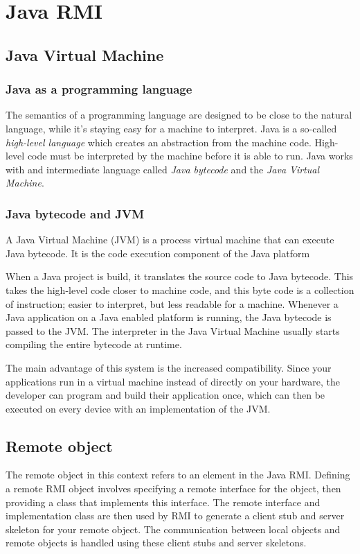 \section{Java RMI}
\subsection{Java Virtual Machine}
\subsubsection{Java as a programming language}
The semantics of a programming language are designed to be close to the natural language, while it's staying easy for a machine to interpret. Java is a so-called \emph{high-level language} which creates an abstraction from the machine code. High-level code must be interpreted by the machine before it is able to run. Java works with and intermediate language called \emph{Java bytecode} and the \emph{Java Virtual Machine}.

\subsubsection{Java bytecode and JVM}
A Java Virtual Machine (JVM) is a process virtual machine that can execute Java bytecode. It is the code execution component of the Java platform

When a Java project is build, it translates the source code to Java bytecode. This takes the high-level code closer to machine code, and this byte code is a collection of instruction; easier to interpret, but less readable for a machine. Whenever a Java application on a Java enabled platform is running, the Java bytecode is passed to the JVM. The interpreter in the Java Virtual Machine usually starts compiling the entire bytecode at runtime. 

The main advantage of this system is the increased compatibility. Since your applications run in a virtual machine instead of directly on your hardware, the developer can program and build their application once, which can then be executed on every device with an implementation of the JVM.

\subsection{Remote object}
The remote object in this context refers to an element in the Java RMI. Defining a remote RMI object involves specifying a remote interface for the object, then providing a class that implements this interface. The remote interface and implementation class are then used by RMI to generate a client stub and server skeleton for your remote object. The communication between local objects and remote objects is handled using these client stubs and server skeletons.

